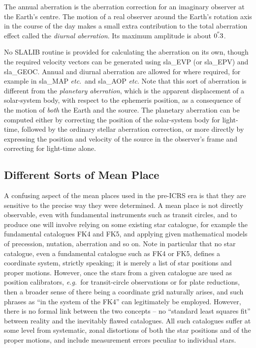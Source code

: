 \documentclass[11pt,twoside]{article}
\newcommand{\arcsec}[2] {\arcseci{#1}$\hspace{-0.4em}.#2$}
\newcommand{\arcsec}[2] {
      {$#1\hspace{-0.05em}^{'\hspace{-0.1em}'}\hspace{-0.4em}.#2$}
   }
\newcommand{\arcseci}[1] {$#1\hspace{-0.05em}$\raisebox{-0.5ex}
                         {$^{'\hspace{-0.1em}'}$}}
\renewcommand{\arcseci}[1] {$#1\hspace{-0.05em}^{'\hspace{-0.1em}'}$}
\begin{document}
The annual aberration is the aberration correction for
an imaginary observer at the Earth's centre.
The motion of a real observer around the Earth's rotation axis in
the course of the day makes a small extra contribution to the total
aberration effect called the {\it diurnal aberration}.  Its
maximum amplitude is about \arcsec{0}{3}.

No SLALIB routine is provided for calculating the aberration on
its own, though the required velocity vectors can be
generated using
sla\_EVP (or
sla\_EPV)
and
sla\_GEOC.
Annual and diurnal aberration are allowed for where required, for example in
sla\_MAP
{\it etc}.\ and
sla\_AOP
{\it etc}.  Note that this sort
of aberration is different from the {\it planetary
aberration}, which is the apparent displacement of a solar-system
body, with respect to the ephemeris position, as a consequence
of the motion of {\it both}\/ the Earth and the source.  The
planetary aberration can be computed either by correcting the
position of the solar-system body for light-time, followed by
the ordinary stellar aberration correction, or more
directly by expressing the position and velocity of the source
in the observer's frame and correcting for light-time alone.

\subsection{Different Sorts of Mean Place}
A confusing aspect of the mean places used in the
pre-ICRS era is that they
are sensitive to the precise way they were determined.  A mean
place is not directly observable, even with fundamental
instruments such as transit circles, and to produce one
will involve relying on some existing star catalogue,
for example the fundamental catalogues FK4 and FK5,
and applying given mathematical models of precession, nutation,
aberration and so on.
Note in particular that no star catalogue,
even a fundamental catalogue such as FK4 or
FK5, defines a coordinate system, strictly speaking;
it is merely a list of star positions and proper motions.
However, once the stars from a given catalogue
are used as position calibrators, {\it e.g.}\ for
transit-circle observations or for plate reductions, then a
broader sense of there being a coordinate grid naturally
arises, and such phrases as ``in the system of
the FK4'' can legitimately be employed.  However,
there is no formal link between the
two concepts -- no ``standard least squares fit'' between
reality and the inevitably flawed catalogues.
All such
catalogues suffer at some level from systematic, zonal distortions
of both the star positions and of the proper motions,
and include measurement errors peculiar to individual
stars.
\end{document}
